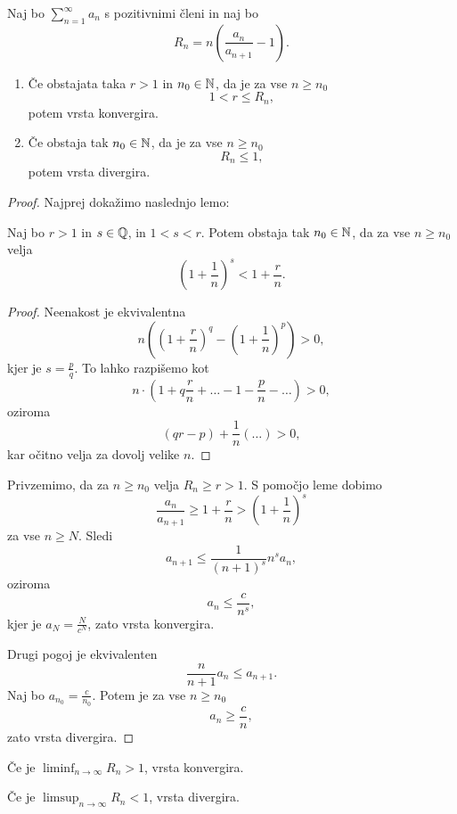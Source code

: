 \documentclass[12pt, a4paper]{article}
\begin{document}
\begin{izrek}
Naj bo $\displaystyle\sum_{n=1}^\infty a_n$ s pozitivnimi členi in naj bo
\[
R_n=n\left(\frac{a_n}{a_{n+1}}-1\right).
\]

\begin{enumerate}[label=\roman*)]
\item Če obstajata taka $r>1$ in $n_0\in\mathbb{N}$, da je za vse $n\geq n_0$
\[
1<r\leq R_n,
\]
potem vrsta konvergira.
\item Če obstaja tak $n_0\in\mathbb{N}$, da je za vse $n\geq n_0$
\[
R_n\leq 1,
\]
potem vrsta divergira.
\end{enumerate}
\end{izrek}

\begin{proof}
Najprej dokažimo naslednjo lemo:

\begin{lema*}
Naj bo $r>1$ in $s\in\mathbb{Q}$, in $1<s<r$. Potem obstaja tak $n_0\in\mathbb{N}$, da za vse $n\geq n_0$ velja
\[
\left(1+\frac{1}{n}\right)^s<1+\frac{r}{n}.
\]
\end{lema*}

\begin{proof}
Neenakost je ekvivalentna
\[
n\left(\left(1+\frac{r}{n}\right)^q-\left(1+\frac{1}{n}\right)^p\right)>0,
\]
kjer je $s=\frac{p}{q}$. To lahko razpišemo kot
\[
n\cdot\left(1+q\frac{r}{n}+\dots-1-\frac{p}{n}-\dots\right)>0,
\]
oziroma
\[
(qr-p)+\frac{1}{n}(\dots)>0,
\]
kar očitno velja za dovolj velike $n$.
\end{proof}

Privzemimo, da za $n\geq n_0$ velja $R_n\geq r>1$. S pomočjo leme dobimo
\[
\frac{a_n}{a_{n+1}}\geq 1+\frac{r}{n}>\left(1+\frac{1}{n}\right)^s
\]
za vse $n\geq N$. Sledi
\[
a_{n+1}\leq \frac{1}{(n+1)^s}n^s a_n,
\]
oziroma
\[
a_n\leq \frac{c}{n^s},
\]
kjer je $a_N=\frac{N}{c^N}$, zato vrsta konvergira.

Drugi pogoj je ekvivalenten
\[
\frac{n}{n+1}a_n\leq a_{n+1}.
\]
Naj bo $a_{n_0}=\frac{c}{n_0}$. Potem je za vse $n\geq n_0$
\[
a_n\geq\frac{c}{n},
\]
zato vrsta divergira.
\end{proof}

\begin{posledica}
Če je $\displaystyle\liminf_{n\to\infty}R_n>1$, vrsta konvergira.
\end{posledica}

\begin{posledica}
Če je $\displaystyle\limsup_{n\to\infty}R_n<1$, vrsta divergira.
\end{posledica}
\end{document}
